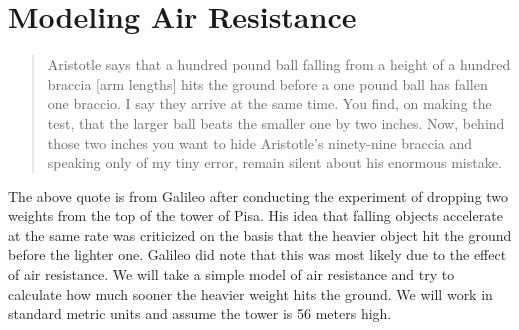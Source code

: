\documentclass{amsbook}
\begin{document}
    \section*{Modeling Air Resistance}
\begin{quote}
Aristotle says that a hundred pound ball falling from a height of a hundred braccia [arm lengths] hits the ground before a one pound ball has fallen one braccio. I say they arrive at the same time. You find, on making the test, that the larger ball beats the smaller one by two inches. Now, behind those two inches you want to hide Aristotle's ninety-nine braccia and speaking only of my tiny error, remain silent about his enormous mistake.
\end{quote}
The above quote is from Galileo after conducting the experiment of dropping two weights from the top of the tower of Pisa. His idea that falling objects accelerate at the same rate was criticized on the basis that the heavier object hit the ground before the lighter one. Galileo did note that this was most likely due to the effect of air resistance. We will take a simple model of air resistance and try to calculate how much sooner the heavier weight hits the ground. We will work in standard metric units and assume the tower is 56 meters high.
\end{document}
